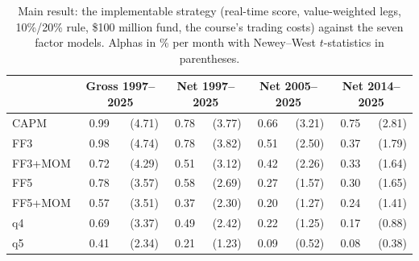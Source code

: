 \documentclass[12pt,a4paper]{article}
\begin{document}
\begin{singlespace}
\begin{table}[!htbp]\centering
\caption{Main result: the implementable strategy (real-time score, value-weighted legs, 10\%/20\% rule, \$100 million fund, the course's trading costs) against the seven factor models. Alphas in \% per month with Newey--West $t$-statistics in parentheses.}\label{tab:allmodels}
\footnotesize
\begin{tabular}{lrrrrrrrr}\toprule
 & \multicolumn{2}{c}{Gross 1997--2025} & \multicolumn{2}{c}{Net 1997--2025} & \multicolumn{2}{c}{Net 2005--2025} & \multicolumn{2}{c}{Net 2014--2025}\\\midrule
CAPM & 0.99 & (4.71) & 0.78 & (3.77) & 0.66 & (3.21) & 0.75 & (2.81)\\
FF3 & 0.98 & (4.74) & 0.78 & (3.82) & 0.51 & (2.50) & 0.37 & (1.79)\\
FF3+MOM & 0.72 & (4.29) & 0.51 & (3.12) & 0.42 & (2.26) & 0.33 & (1.64)\\
FF5 & 0.78 & (3.57) & 0.58 & (2.69) & 0.27 & (1.57) & 0.30 & (1.65)\\
FF5+MOM & 0.57 & (3.51) & 0.37 & (2.30) & 0.20 & (1.27) & 0.24 & (1.41)\\
q4 & 0.69 & (3.37) & 0.49 & (2.42) & 0.22 & (1.25) & 0.17 & (0.88)\\
q5 & 0.41 & (2.34) & 0.21 & (1.23) & 0.09 & (0.52) & 0.08 & (0.38)\\
\bottomrule\end{tabular}
\end{table}


\end{singlespace}
\end{document}
